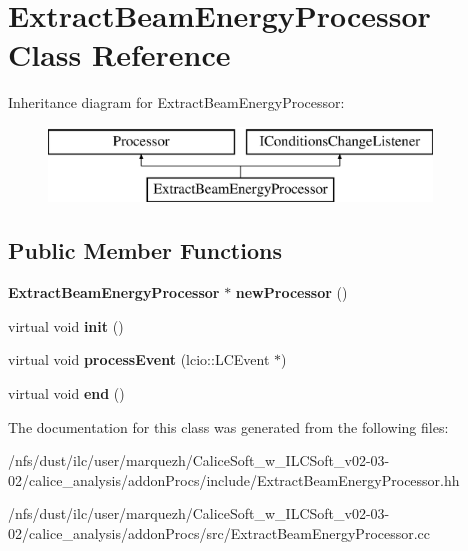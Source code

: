 \section{Extract\-Beam\-Energy\-Processor Class Reference}
\label{classExtractBeamEnergyProcessor}
Inheritance diagram for Extract\-Beam\-Energy\-Processor\-:\begin{figure}[H]
\begin{center}
\leavevmode
\includegraphics[height=2.000000cm]{classExtractBeamEnergyProcessor}
\end{center}
\end{figure}
\subsection*{Public Member Functions}
\begin{DoxyCompactItemize}
\item 
{\bf Extract\-Beam\-Energy\-Processor} $\ast$ {\bfseries new\-Processor} ()\label{classExtractBeamEnergyProcessor_ac6abcb9dbb0f7237b8b8779496acd9e2}

\item 
virtual void {\bfseries init} ()\label{classExtractBeamEnergyProcessor_a0eac13d2b34280c8ae1a72c6da28f0eb}

\item 
virtual void {\bfseries process\-Event} (lcio\-::\-L\-C\-Event $\ast$)\label{classExtractBeamEnergyProcessor_a3a3d92d23bfba19e22c7e9f9cc4a94e8}

\item 
virtual void {\bfseries end} ()\label{classExtractBeamEnergyProcessor_a3e42907216567e34b02436c664fad568}

\end{DoxyCompactItemize}


The documentation for this class was generated from the following files\-:\begin{DoxyCompactItemize}
\item 
/nfs/dust/ilc/user/marquezh/\-Calice\-Soft\-\_\-w\-\_\-\-I\-L\-C\-Soft\-\_\-v02-\/03-\/02/calice\-\_\-analysis/addon\-Procs/include/Extract\-Beam\-Energy\-Processor.\-hh\item 
/nfs/dust/ilc/user/marquezh/\-Calice\-Soft\-\_\-w\-\_\-\-I\-L\-C\-Soft\-\_\-v02-\/03-\/02/calice\-\_\-analysis/addon\-Procs/src/Extract\-Beam\-Energy\-Processor.\-cc\end{DoxyCompactItemize}
